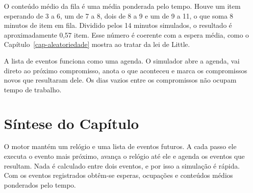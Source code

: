 O conteúdo médio da fila é uma média ponderada pelo tempo. Houve um item esperando de 3 a 6, um de 7 a 8, dois de 8 a 9 e um de 9 a 11, o que soma 8 minutos de item em fila. Dividido pelos 14 minutos simulados, o resultado é aproximadamente 0,57 item. Esse número é coerente com a espera média, como o Capítulo~\ref{cap-aleatoriedade} mostra ao tratar da lei de Little.

\begin{analogia}
A lista de eventos funciona como uma agenda. O simulador abre a agenda, vai direto ao próximo compromisso, anota o que aconteceu e marca os compromissos novos que resultaram dele. Os dias vazios entre os compromissos não ocupam tempo de trabalho.
\end{analogia}

\section{Síntese do Capítulo}

\begin{sintese}
O motor mantém um relógio e uma lista de eventos futuros. A cada passo ele executa o evento mais próximo, avança o relógio até ele e agenda os eventos que resultam. Nada é calculado entre dois eventos, e por isso a simulação é rápida. Com os eventos registrados obtêm-se esperas, ocupações e conteúdos médios ponderados pelo tempo.
\end{sintese}
